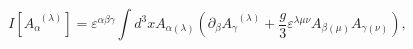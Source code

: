 \begin{equation}
I\left[ A_{\alpha }^{\;\;(\lambda )}\right] =\varepsilon ^{\alpha \beta
\gamma }\int d^{3}xA_{\alpha (\lambda )}\left( \partial _{\beta }A_{\gamma
}^{\;\;(\lambda )}+\frac{g}{3}\varepsilon ^{\lambda \mu \nu }A_{\beta (\mu
)}A_{\gamma (\nu )}\right) ,  \label{bf108}
\end{equation}

